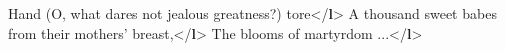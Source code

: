 \begin{shaded}
\hspace*{1em}\hspace*{1em}\hspace*{1em}\hspace*{1em}\hspace*{1em}\hspace*{1em}\hspace*{1em}Hand (O, what dares not jealous greatness?) tore{</\textbf{l}>}\mbox{}\newline 
\hspace*{1em}\hspace*{1em}\hspace*{1em}\hspace*{1em}\hspace*{1em}\hspace*{1em}\hspace*{1em}A thousand sweet babes from their mothers' breast,{</\textbf{l}>}\mbox{}\newline 
\hspace*{1em}\hspace*{1em}\hspace*{1em}\hspace*{1em}\hspace*{1em}\hspace*{1em}\hspace*{1em}The blooms of martyrdom ...{</\textbf{l}>}\mbox{}\newline 
\hspace*{1em}\hspace*{1em}\hspace*{1em}\hspace*{1em}\hspace*{1em}\hspace*{1em}\mbox{}\newline 
\hspace*{1em}\hspace*{1em}\hspace*{1em}\hspace*{1em}\hspace*{1em}\mbox{}\newline 
\hspace*{1em}\hspace*{1em}\hspace*{1em}\hspace*{1em}\mbox{}\newline 

\end{shaded}
